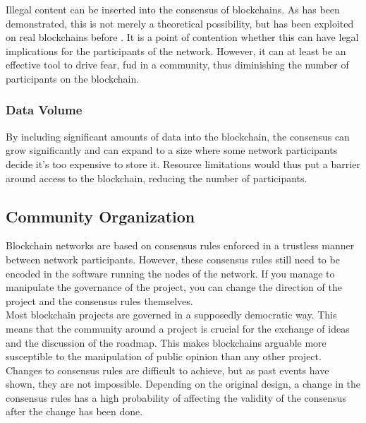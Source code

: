 \documentclass[12pt,a4paper]{article}
\begin{document}
Illegal content can be inserted into the \gls{consensus} of \gls{blockchain}s. As has been demonstrated, this is not merely a theoretical possibility, but has been exploited on real \gls{blockchain}s before \cite{content}. It is a point of contention whether this can have legal implications for the participants of the network. However, it can at least be an effective tool to drive fear, \acrfull{fud} in a community, thus diminishing the number of participants on the \gls{blockchain}.\\

\subsubsection{Data Volume}

By including significant amounts of data into the blockchain, the \gls{consensus} can grow significantly and can expand to a size where some network participants decide it's too expensive to store it. Resource limitations would thus put a barrier around access to the \gls{blockchain}, reducing the number of participants.\\

\subsection{Community Organization}

Blockchain networks are based on consensus rules enforced in a trustless manner between network participants. However, these consensus rules still need to be encoded in the software running the nodes of the network. If you manage to manipulate the governance of the project, you can change the direction of the project and the consensus rules themselves.\\

Most blockchain projects are governed in a supposedly democratic way. This means that the community around a project is crucial for the exchange of ideas and the discussion of the roadmap. This makes \gls{blockchain}s arguable more susceptible to the manipulation of public opinion than any other project.\\

Changes to consensus rules are difficult to achieve, but as past events have shown, they are not impossible. Depending on the original design, a change in the consensus rules has a high probability of affecting the validity of the consensus after the change has been done.\\
\end{document}
